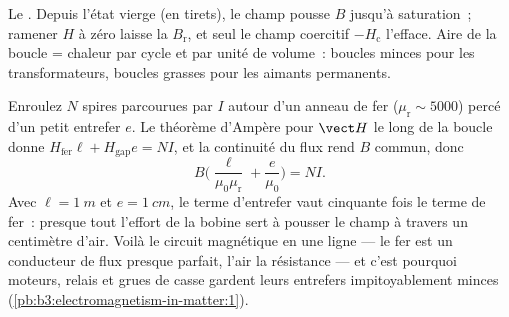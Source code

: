 \begin{omfigure}

{\small Le . Depuis l'état vierge (en tirets), le
champ pousse $B$ jusqu'à saturation~; ramener $H$ à zéro laisse la
 $B_{\text{r}}$, et seul le champ coercitif
$-H_{\text{c}}$ l'efface. Aire de la boucle = chaleur par cycle et par
unité de volume~: boucles minces pour les transformateurs, boucles
grasses pour les aimants permanents.}
\end{omfigure}

\begin{example}\label{ex:b3:electromagnetism-in-matter:electromagnet}
Enroulez $N$ spires parcourues par $I$ autour d'un anneau de fer ($\mu_{\text{r}}
\sim 5000$) percé d'un petit entrefer $e$. Le théorème d'Ampère pour
$\vect H$ le long de la boucle donne
$H_{\text{fer}}\ell + H_{\text{gap}}e = NI$, et la continuité du flux
rend $B$ commun, donc
\[
B\Big(\frac{\ell}{\mu_0\mu_{\text{r}}} + \frac{e}{\mu_0}\Big) = NI .
\]
Avec $\ell = \qty{1}{m}$ et $e = \qty{1}{cm}$, le terme d'entrefer
vaut cinquante fois le terme de fer~: presque tout l'effort de la
bobine sert à pousser le champ à travers un centimètre d'air. Voilà le
circuit magnétique en une ligne --- le fer est un conducteur de flux
presque parfait, l'air la résistance --- et c'est pourquoi moteurs,
relais et grues de casse gardent leurs entrefers impitoyablement
minces (\cref{pb:b3:electromagnetism-in-matter:1}).
\end{example}

